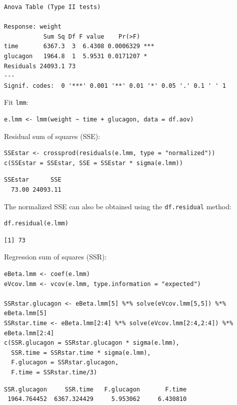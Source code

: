 \documentclass[12pt]{article}
\begin{document}
\begin{verbatim}
Anova Table (Type II tests)

Response: weight
           Sum Sq Df F value    Pr(>F)    
time       6367.3  3  6.4308 0.0006329 ***
glucagon   1964.8  1  5.9531 0.0171207 *  
Residuals 24093.1 73                      
---
Signif. codes:  0 '***' 0.001 '**' 0.01 '*' 0.05 '.' 0.1 ' ' 1
\end{verbatim}


Fit \texttt{lmm}:
\lstset{language=r,label= ,caption= ,captionpos=b,numbers=none}
\begin{lstlisting}
e.lmm <- lmm(weight ~ time + glucagon, data = df.aov)
\end{lstlisting}

Residual sum of squares (SSE):
\lstset{language=r,label= ,caption= ,captionpos=b,numbers=none}
\begin{lstlisting}
SSEstar <- crossprod(residuals(e.lmm, type = "normalized"))
c(SSEstar = SSEstar, SSE = SSEstar * sigma(e.lmm))
\end{lstlisting}

\begin{verbatim}
SSEstar      SSE 
  73.00 24093.11
\end{verbatim}


The normalized SSE can also be obtained using the \texttt{df.residual} method:
\lstset{language=r,label= ,caption= ,captionpos=b,numbers=none}
\begin{lstlisting}
df.residual(e.lmm)
\end{lstlisting}

\begin{verbatim}
[1] 73
\end{verbatim}


Regression sum of squares (SSR):
\lstset{language=r,label= ,caption= ,captionpos=b,numbers=none}
\begin{lstlisting}
eBeta.lmm <- coef(e.lmm)
eVcov.lmm <- vcov(e.lmm, type.information = "expected")

SSRstar.glucagon <- eBeta.lmm[5] %*% solve(eVcov.lmm[5,5]) %*% eBeta.lmm[5] 
SSRstar.time <- eBeta.lmm[2:4] %*% solve(eVcov.lmm[2:4,2:4]) %*% eBeta.lmm[2:4] 
c(SSR.glucagon = SSRstar.glucagon * sigma(e.lmm),
  SSR.time = SSRstar.time * sigma(e.lmm),
  F.glucagon = SSRstar.glucagon,
  F.time = SSRstar.time/3)
\end{lstlisting}

\begin{verbatim}
SSR.glucagon     SSR.time   F.glucagon       F.time 
 1964.764452  6367.324429     5.953062     6.430810
\end{verbatim}
\end{document}
